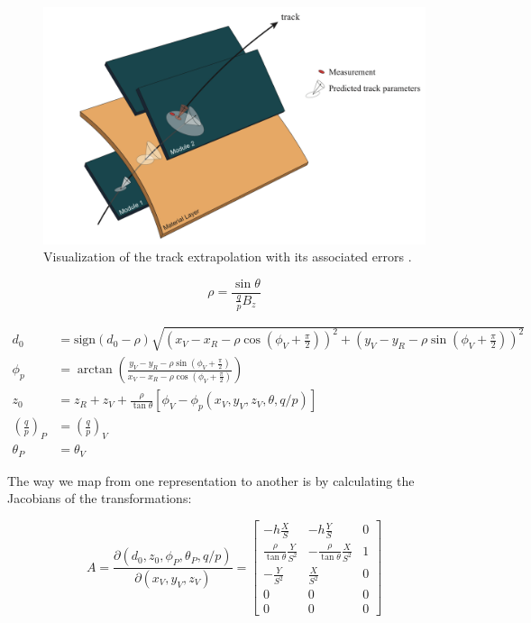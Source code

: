 \begin{figure}[hbt]
\includegraphics[width=\textwidth]{figures/cp-graphics/ATL-SOFT-PUB-2007-005/track-extrap-material-int}
\caption{Visualization of the track extrapolation with its associated errors \cite{ATL-SOFT-PUB-2007-005}.}
\label{fig:track-extrap-material-int}
\end{figure}

\begin{equation}
\rho = \frac{\sin \theta}{\frac{q}{p} B_z}
\end{equation}

\begin{align}
d_0 &= \text{sign} \left( d_0 - \rho \right) \sqrt{\left(x_V - x_R - \rho \cos \left(\phi_V + \frac{\pi}{2} \right) \right)^2 +  \left(y_V - y_R - \rho \sin \left(\phi_V + \frac{\pi}{2} \right) \right)^2 } \\
\phi_p &= \arctan \left( \frac{y_V - y_R - \rho \sin \left( \phi_V + \frac{\pi}{2}\right)}{x_V - x_R - \rho \cos \left( \phi_V + \frac{\pi}{2}\right)} \right) \\
z_0 &= z_R + z_V + \frac{\rho}{\tan \theta } \left[ \phi_V - \phi_p (x_V, y_V, z_V, \theta, q/p) \right]\\
\left( \frac{q}{p} \right)_P &= \left( \frac{q}{p} \right)_V \\
\theta_P &= \theta_V
\end{align}

The way we map from one representation to another is by calculating the Jacobians of the transformations:

\begin{equation}
A = \frac{\partial (d_0, z_0, \phi_P, \theta_P, q/p)}{\partial (x_V, y_V, z_V)} = 
\begin{bmatrix}
- h \frac{X}{S} & - h \frac{Y}{S} & 0 \\
\frac{\rho}{\tan \theta}  \frac{Y}{S^2} & - \frac{\rho}{\tan \theta}  \frac{X}{S^2}  & 1 \\
- \frac{Y}{S^2} &  \frac{X}{S^2} & 0 \\
0 & 0 & 0 \\
0 & 0 & 0
\end{bmatrix}
\end{equation}

